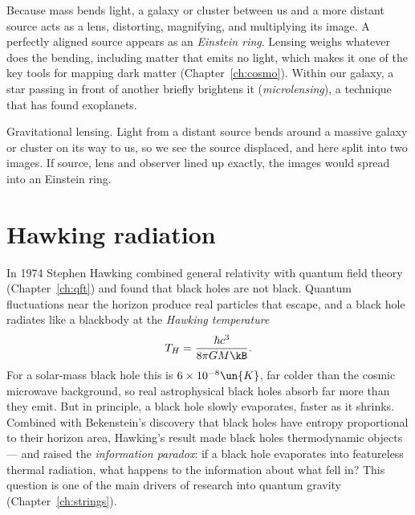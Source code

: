 Because mass bends light, a galaxy or cluster between us and a more distant source acts as a lens, distorting, magnifying, and multiplying its image. A perfectly aligned source appears as an \emph{Einstein ring}. Lensing weighs whatever does the bending, including matter that emits no light, which makes it one of the key tools for mapping dark matter (Chapter~\ref{ch:cosmo}). Within our galaxy, a star passing in front of another briefly brightens it (\emph{microlensing}), a technique that has found exoplanets.

\begin{center}
\begin{minipage}{\linewidth}\centering
{}

{\small Gravitational lensing. Light from a distant source bends around a massive galaxy or cluster on its way to us, so we see the source displaced, and here split into two images. If source, lens and observer lined up exactly, the images would spread into an Einstein ring.}
\end{minipage}
\end{center}

\section{Hawking radiation}

In 1974 Stephen Hawking combined general relativity with quantum field theory (Chapter~\ref{ch:qft}) and found that black holes are not black. Quantum fluctuations near the horizon produce real particles that escape, and a black hole radiates like a blackbody at the \emph{Hawking temperature}
\[
  T_H = \frac{\hbar c^3}{8\pi GM\kB}.
\]
For a solar-mass black hole this is $6\times10^{-8}\un{K}$, far colder than the cosmic microwave background, so real astrophysical black holes absorb far more than they emit. But in principle, a black hole slowly evaporates, faster as it shrinks. Combined with Bekenstein's discovery that black holes have entropy proportional to their horizon area, Hawking's result made black holes thermodynamic objects --- and raised the \emph{information paradox}: if a black hole evaporates into featureless thermal radiation, what happens to the information about what fell in? This question is one of the main drivers of research into quantum gravity (Chapter~\ref{ch:strings}).


